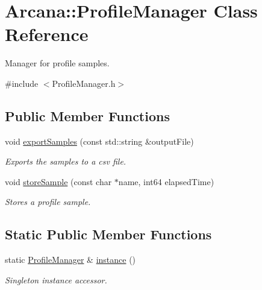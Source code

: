 \hypertarget{class_arcana_1_1_profile_manager}{}\section{Arcana\+:\+:Profile\+Manager Class Reference}
\label{class_arcana_1_1_profile_manager}


Manager for profile samples.  




{\ttfamily \#include $<$Profile\+Manager.\+h$>$}

\subsection*{Public Member Functions}
\begin{DoxyCompactItemize}
\item 
\mbox{\label{class_arcana_1_1_profile_manager_a4a65e6962c23f6d40f905d89c6850805}} 
void \mbox{\hyperlink{class_arcana_1_1_profile_manager_a4a65e6962c23f6d40f905d89c6850805}{export\+Samples}} (const std\+::string \&output\+File)
\begin{DoxyCompactList}\small\item\em Exports the samples to a csv file. \end{DoxyCompactList}\item 
\mbox{\label{class_arcana_1_1_profile_manager_a9b4e75f1ce6aae83bd06479a6c4efc3a}} 
void \mbox{\hyperlink{class_arcana_1_1_profile_manager_a9b4e75f1ce6aae83bd06479a6c4efc3a}{store\+Sample}} (const char $\ast$name, int64 elapsed\+Time)
\begin{DoxyCompactList}\small\item\em Stores a profile sample. \end{DoxyCompactList}\end{DoxyCompactItemize}
\subsection*{Static Public Member Functions}
\begin{DoxyCompactItemize}
\item 
\mbox{\label{class_arcana_1_1_profile_manager_aca7041e5f3e4b33258f73f2138b8fbd4}} 
static \mbox{\hyperlink{class_arcana_1_1_profile_manager}{Profile\+Manager}} \& \mbox{\hyperlink{class_arcana_1_1_profile_manager_aca7041e5f3e4b33258f73f2138b8fbd4}{instance}} ()
\begin{DoxyCompactList}\small\item\em Singleton instance accessor. \end{DoxyCompactList}\end{DoxyCompactItemize}


